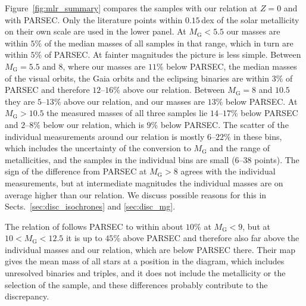 \documentclass{aa}
\begin{document}
Figure~\ref{fig:mlr_summary} compares the samples with our relation at $Z=0$ and with PARSEC. Only the literature points within $0.15$\,dex of the solar metallicity on their own scale are used in the lower panel. At $M_{\mathrm{G}}<5.5$ our masses are within $5\%$ of the median masses of all samples in that range, which in turn are within $5\%$ of PARSEC. At fainter magnitudes the picture is less simple. Between $M_{\mathrm{G}}=5.5$ and $8$, where our masses are $11\%$ below PARSEC, the median masses of the visual orbits, the Gaia orbits and the eclipsing binaries are within $3\%$ of PARSEC and therefore $12$--$16\%$ above our relation. Between $M_{\mathrm{G}}=8$ and $10.5$ they are $5$--$13\%$ above our relation, and our masses are $13\%$ below PARSEC. At $M_{\mathrm{G}}>10.5$ the measured masses of all three samples lie $14$--$17\%$ below PARSEC and $2$--$8\%$ below our relation, which is $9\%$ below PARSEC. The scatter of the individual measurements around our relation is mostly $6$--$22\%$ in these bins, which includes the uncertainty of the conversion to $M_{\mathrm{G}}$ and the range of metallicities, and the samples in the individual bins are small ($6$--$38$ points). The sign of the difference from PARSEC at $M_{\mathrm{G}}>8$ agrees with the individual measurements, but at intermediate magnitudes the individual masses are on average higher than our relation. We discuss possible reasons for this in Sects.~\ref{sec:disc_isochrones} and \ref{sec:disc_mg}.

The relation of \citet{Hwang2024DynamicalMasses} follows PARSEC to within about $10\%$ at $M_{\mathrm{G}}<9$, but at $10<M_{\mathrm{G}}<12.5$ it is up to $45\%$ above PARSEC and therefore also far above the individual masses and our relation, which are below PARSEC there. Their map gives the mean mass of all stars at a position in the diagram, which includes unresolved binaries and triples, and it does not include the metallicity or the selection of the sample, and these differences probably contribute to the discrepancy.
\end{document}
